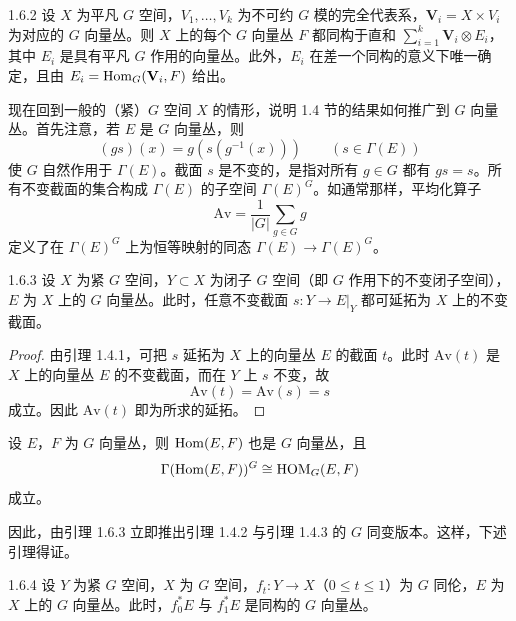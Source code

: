 \begin{proposition*}{1.6.2}
  设 $X$ 为平凡 $G$ 空间，$V_1,\dots,V_k$ 为不可约 $G$ 模的完全代表系，$\mathbf{V}_i=X\times V_i$ 为对应的 $G$ 向量丛。则 $X$ 上的每个 $G$ 向量丛 $F$ 都同构于直和 $\sum_{i=1}^{k}\mathbf{V}_i\otimes E_i$，其中 $E_i$ 是具有平凡 $G$ 作用的向量丛。此外，$E_i$ 在差一个同构的意义下唯一确定，且由 $E_i=\operatorname{Hom}_G(\mathbf{V}_i,F)$ 给出。
\end{proposition*}

现在回到一般的（紧）$G$ 空间 $X$ 的情形，说明 1.4 节的结果如何推广到 $G$ 向量丛。首先注意，若 $E$ 是 $G$ 向量丛，则
\[
(gs)(x)=g(s(g^{-1}(x)))\qquad(s\in\Gamma(E))
\]
使 $G$ 自然作用于 $\Gamma(E)$。截面 $s$ 是不变的，是指对所有 $g\in G$ 都有 $gs=s$。所有不变截面的集合构成 $\Gamma(E)$ 的子空间 $\Gamma(E)^{G}$。如通常那样，平均化算子
\[
\mathrm{Av}=\frac{1}{|G|}\sum_{g\in G}g
\]
定义了在 $\Gamma(E)^{G}$ 上为恒等映射的同态 $\Gamma(E)\to\Gamma(E)^{G}$。

\begin{lemma*}{1.6.3}
  设 $X$ 为紧 $G$ 空间，$Y\subset X$ 为闭子 $G$ 空间（即 $G$ 作用下的不变闭子空间），$E$ 为 $X$ 上的 $G$ 向量丛。此时，任意不变截面 $s\colon Y\to E|_Y$ 都可延拓为 $X$ 上的不变截面。
\end{lemma*}

\begin{proof}
  由引理 1.4.1，可把 $s$ 延拓为 $X$ 上的向量丛 $E$ 的截面 $t$。此时 $\mathrm{Av}(t)$ 是 $X$ 上的向量丛 $E$ 的不变截面，而在 $Y$ 上 $s$ 不变，故
  \[
  \mathrm{Av}(t)=\mathrm{Av}(s)=s
  \]
  成立。因此 $\mathrm{Av}(t)$ 即为所求的延拓。
\end{proof}

设 $E$，$F$ 为 $G$ 向量丛，则 $\operatorname{Hom}(E,F)$ 也是 $G$ 向量丛，且
\[
\Gamma(\operatorname{Hom}(E,F))^{G}\cong\mathrm{HOM}_G(E,F)
\]
成立。

因此，由引理 1.6.3 立即推出引理 1.4.2 与引理 1.4.3 的 $G$ 同变版本。这样，下述引理得证。

\begin{lemma*}{1.6.4}
  设 $Y$ 为紧 $G$ 空间，$X$ 为 $G$ 空间，$f_t\colon Y\to X$（$0\le t\le 1$）为 $G$ 同伦，$E$ 为 $X$ 上的 $G$ 向量丛。此时，$f_0^{*}E$ 与 $f_1^{*}E$ 是同构的 $G$ 向量丛。
\end{lemma*}

